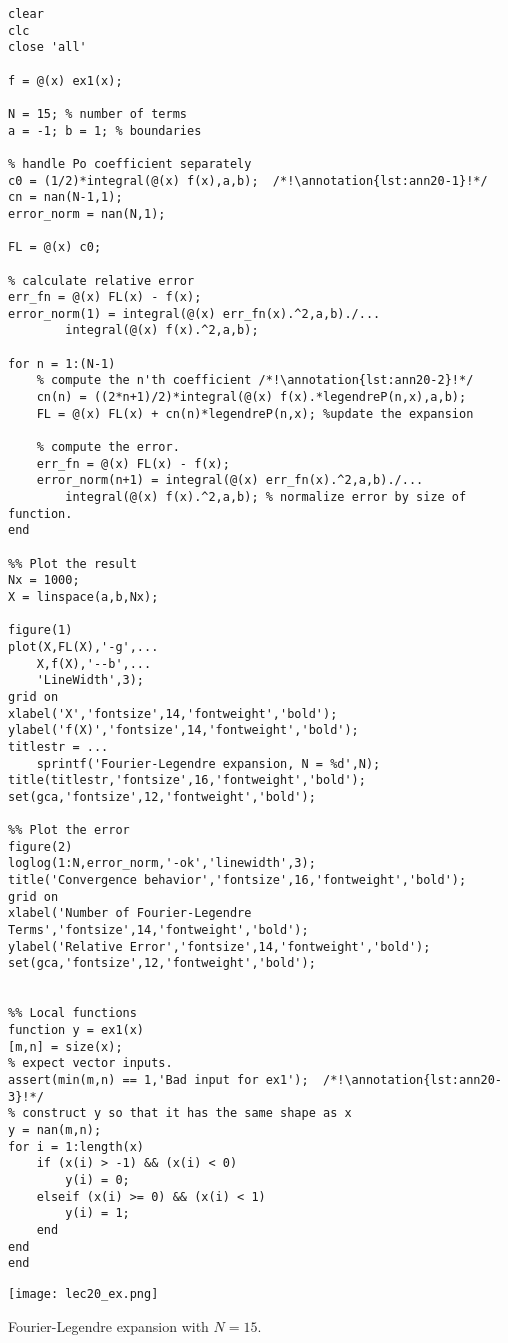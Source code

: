 \begin{lstlisting}[name=lec20_ex, style=myMatlab]
clear
clc
close 'all'

f = @(x) ex1(x);

N = 15; % number of terms 
a = -1; b = 1; % boundaries

% handle Po coefficient separately
c0 = (1/2)*integral(@(x) f(x),a,b);  /*!\annotation{lst:ann20-1}!*/
cn = nan(N-1,1);
error_norm = nan(N,1); 

FL = @(x) c0;

% calculate relative error
err_fn = @(x) FL(x) - f(x);
error_norm(1) = integral(@(x) err_fn(x).^2,a,b)./...
        integral(@(x) f(x).^2,a,b); 

for n = 1:(N-1)
    % compute the n'th coefficient /*!\annotation{lst:ann20-2}!*/
    cn(n) = ((2*n+1)/2)*integral(@(x) f(x).*legendreP(n,x),a,b); 
    FL = @(x) FL(x) + cn(n)*legendreP(n,x); %update the expansion
    
    % compute the error.
    err_fn = @(x) FL(x) - f(x);
    error_norm(n+1) = integral(@(x) err_fn(x).^2,a,b)./...
        integral(@(x) f(x).^2,a,b); % normalize error by size of function.
end

%% Plot the result
Nx = 1000;
X = linspace(a,b,Nx);

figure(1)
plot(X,FL(X),'-g',...
    X,f(X),'--b',...
    'LineWidth',3);
grid on
xlabel('X','fontsize',14,'fontweight','bold');
ylabel('f(X)','fontsize',14,'fontweight','bold');
titlestr = ...
    sprintf('Fourier-Legendre expansion, N = %d',N);
title(titlestr,'fontsize',16,'fontweight','bold');
set(gca,'fontsize',12,'fontweight','bold');

%% Plot the error
figure(2)
loglog(1:N,error_norm,'-ok','linewidth',3);
title('Convergence behavior','fontsize',16,'fontweight','bold');
grid on
xlabel('Number of Fourier-Legendre Terms','fontsize',14,'fontweight','bold');
ylabel('Relative Error','fontsize',14,'fontweight','bold');
set(gca,'fontsize',12,'fontweight','bold');


%% Local functions
function y = ex1(x)
[m,n] = size(x); 
% expect vector inputs.
assert(min(m,n) == 1,'Bad input for ex1');  /*!\annotation{lst:ann20-3}!*/
% construct y so that it has the same shape as x
y = nan(m,n); 
for i = 1:length(x) 
    if (x(i) > -1) && (x(i) < 0) 
        y(i) = 0;
    elseif (x(i) >= 0) && (x(i) < 1)
        y(i) = 1;
    end
end
end
\end{lstlisting}
\begin{marginfigure}
\texttt{[image: lec20\_ex.png]}
\caption{Fourier-Legendre expansion with $N=15$.}
\label{fig:lec20-ex}
\end{marginfigure}

